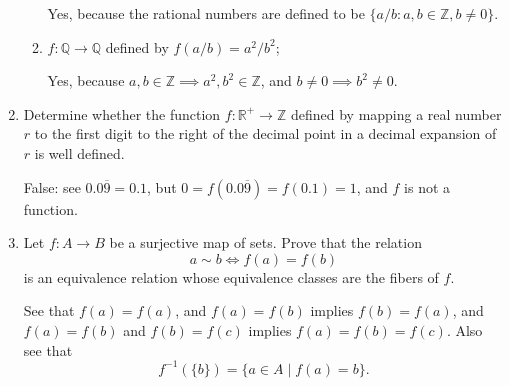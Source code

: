 \begin{enumerate}
\begin{enumerate}
        Yes, because the rational numbers are defined to be $\{a/b:a,b\in\mathbb{Z}, b\neq0\}$.
        \item $f : \mathbb{Q} \to \mathbb{Q}$ defined by $f(a/b) = a^2/b^2$;
        
        Yes, because $a,b\in\mathbb{Z}\implies a^2,b^2\in\mathbb{Z}$, and $b\neq0\implies b^2\neq0$.
    \end{enumerate}
    \item Determine whether the function $f : \mathbb{R}^+ \to \mathbb{Z}$ defined by mapping a real number $r$ to the first digit to the right of the decimal point in a decimal expansion of $r$ is well defined.
    
    False: see $0.0\overline{9}=0.1$, but $0=f(0.0\overline{9})=f(0.1)=1$, and $f$ is not a function.
    \item Let $f: A \to B$ be a surjective map of sets. Prove that the relation
    \[
        a \sim b \iff f(a) = f(b)
    \]
    is an equivalence relation whose equivalence classes are the fibers of $f$.

    See that $f(a)=f(a)$, and $f(a)=f(b)$ implies $f(b)=f(a)$, and $f(a)=f(b)$ and $f(b)=f(c)$ implies $f(a)=f(b)=f(c)$.
    Also see that
    \[
        f^{-1}(\{b\})=\{a\in A\mid f(a)=b\}.
    \]
\end{enumerate}

